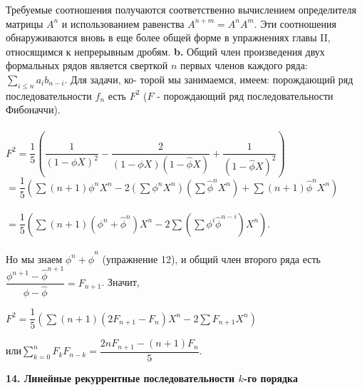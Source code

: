 Требуемые соотношения получаются соответственно вычислением\linebreak
определителя матрицы $A^n$ и использованием равенства $A^{n+m}=A^n A^m$.\linebreak
Эти соотношения обнаруживаются вновь в еще более общей форме в\linebreak
упражнениях главы II, относящимся к непрерывным дробям.\newline
\hspace*{15pt}\textbf{b.} Общий член произведения двух формальных рядов является\linebreak
сверткой $n$ первых членов каждого ряда: $\sum_{i \leqslant n}a_ib_{n-i}$. Для задачи, ко-\linebreak
торой мы занимаемся, имеем: порождающий ряд последовательности\linebreak
$f_n$ есть $F^2$ ($F$ - порождающий ряд последовательности Фибоначчи).\\\\
$F^2=\dfrac{1}{5}\left(\dfrac{1}{(1-\phi X)^2}-\dfrac{2}{(1-\phi X)(1-\hat{\phi} X)}+\dfrac{1}{(1-\hat{\phi} X)^2}\right)$\newline
\hspace*{15pt}$=\dfrac{1}{5}\left(\sum(n+1)\phi^nX^n-2(\sum\phi^nX^n)(\sum\hat{\phi}^nX^n)+\sum(n+1)\hat{\phi}^nX^n\right)$\\\\
\hspace*{15pt}$=\dfrac{1}{5}\left(\sum(n+1)(\phi^n+\hat{\phi}^n)X^n-2\sum(\sum\phi^i\hat{\phi}^{n-i})X^n\right)$.\\\\
Но мы знаем $\phi^n+\hat{\phi}^n$ (упражнение 12), и общий член второго ряда есть\linebreak
$\dfrac{\phi^{n+1}-\hat{\phi}^{n+1}}{\phi-\hat{\phi}}=F_{n+1}$. Значит,
\begin{center}
$F^2=\dfrac{1}{5}\left(\sum(n+1)(2F_{n+1}-F_n)X^n-2\sum F_{n+1}X^n\right)$
\end{center}
\begin{center}
или\hspace{15pt}$\displaystyle\sum_{k=0}^nF_kF_{n-k} = \dfrac{2nF_{n+1}-(n+1)F_n}{5}$.
\end{center}

\noindent\textbf{14. Линейные рекуррентные последовательности $k$-го\newline
порядка}\\

